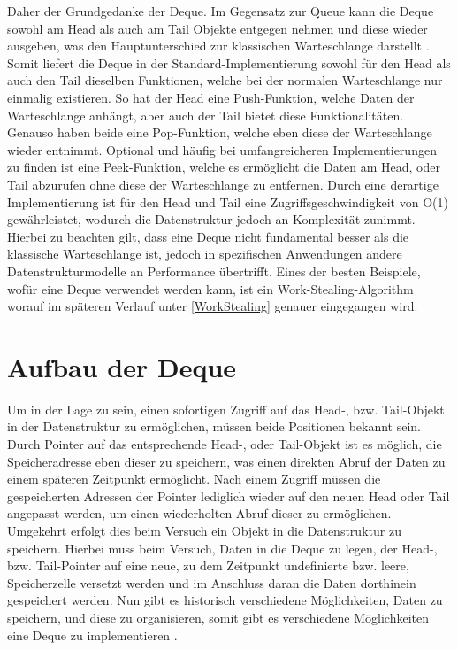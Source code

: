 \documentclass{TUBAFarbeiten}
\begin{document}
Daher der Grundgedanke der Deque. Im Gegensatz zur Queue kann die Deque sowohl am Head als auch am Tail Objekte entgegen nehmen und diese wieder ausgeben, was den Hauptunterschied zur klassischen Warteschlange darstellt \cite[238]{maclaren1969art}. Somit liefert die Deque in der Standard-Implementierung  sowohl für den Head als auch den Tail dieselben Funktionen, welche bei der normalen Warteschlange nur einmalig existieren. So hat der Head eine Push-Funktion, welche Daten der Warteschlange anhängt, aber auch der Tail bietet diese Funktionalitäten. Genauso haben beide eine Pop-Funktion, welche eben diese der Warteschlange wieder entnimmt. Optional und häufig bei umfangreicheren Implementierungen zu finden ist eine Peek-Funktion, welche es ermöglicht die Daten am Head, oder Tail abzurufen ohne diese der Warteschlange zu entfernen. Durch eine derartige Implementierung ist für den Head und Tail eine Zugriffsgeschwindigkeit von O(1) gewährleistet, wodurch die Datenstruktur jedoch an Komplexität zunimmt. Hierbei zu beachten gilt, dass eine Deque nicht fundamental besser als die klassische Warteschlange ist, jedoch in spezifischen Anwendungen andere Datenstrukturmodelle an Performance übertrifft. Eines der besten Beispiele, wofür eine Deque verwendet werden kann, ist ein Work-Stealing-Algorithm worauf im späteren Verlauf unter \ref{WorkStealing} genauer eingegangen wird.
\section{Aufbau der Deque}
Um in der Lage zu sein, einen sofortigen Zugriff auf das Head-, bzw. Tail-Objekt in der Datenstruktur zu ermöglichen, müssen beide Positionen bekannt sein. Durch Pointer auf das entsprechende Head-, oder Tail-Objekt ist es möglich, die Speicheradresse eben dieser zu speichern, was einen direkten Abruf der Daten zu einem späteren Zeitpunkt ermöglicht. Nach einem Zugriff müssen die gespeicherten Adressen der Pointer lediglich wieder auf den neuen Head oder Tail angepasst werden, um einen wiederholten Abruf dieser zu ermöglichen. Umgekehrt erfolgt dies beim Versuch ein Objekt in die Datenstruktur zu speichern. Hierbei muss beim Versuch, Daten in die Deque zu legen, der Head-, bzw. Tail-Pointer auf eine neue, zu dem Zeitpunkt undefinierte bzw. leere, Speicherzelle versetzt werden und im Anschluss daran die Daten dorthinein gespeichert werden. Nun gibt es historisch verschiedene Möglichkeiten, Daten zu speichern, und diese zu organisieren, somit gibt es verschiedene Möglichkeiten eine Deque zu implementieren \cite[2]{horowitz1976fundamentals}.
\end{document}
